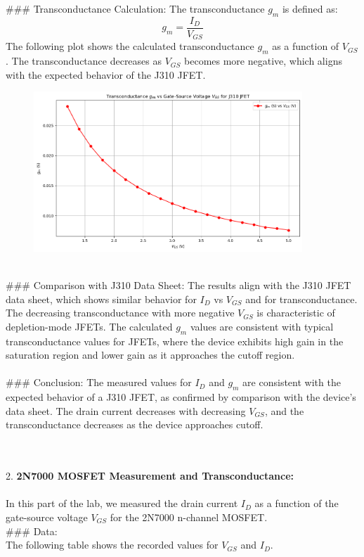 \documentclass{article}
\begin{document}
### Transconductance Calculation:
The transconductance \( g_m \) is defined as:
\[
g_m = \frac{I_D}{V_{GS}}
\]
The following plot shows the calculated transconductance \( g_m \) as a function of \( V_{GS} \). The transconductance decreases as \( V_{GS} \) becomes more negative, which aligns with the expected behavior of the J310 JFET.

\begin{figure}[H]
    \centering
    \includegraphics[width=0.9\textwidth]{./img/Lab6_1_gmVSVgs.png}
    \caption{}
    \label{fig:graph1} 
\end{figure}
\\ 
### Comparison with J310 Data Sheet:
The results align with the J310 JFET data sheet, which shows similar behavior for \( I_D \) vs \( V_{GS} \) and for transconductance. The decreasing transconductance with more negative \( V_{GS} \) is characteristic of depletion-mode JFETs. The calculated \( g_m \) values are consistent with typical transconductance values for JFETs, where the device exhibits high gain in the saturation region and lower gain as it approaches the cutoff region.
\\ \\  
### Conclusion:
The measured values for \( I_D \) and \( g_m \) are consistent with the expected behavior of a J310 JFET, as confirmed by comparison with the device's data sheet. The drain current decreases with decreasing \( V_{GS} \), and the transconductance decreases as the device approaches cutoff.

\\ \\ 
2. \textbf{2N7000 MOSFET Measurement and Transconductance:}
\\ \\ 

In this part of the lab, we measured the drain current \( I_D \) as a function of the gate-source voltage \( V_{GS} \) for the 2N7000 n-channel MOSFET.
\\ 
### Data:\\ 
The following table shows the recorded values for \( V_{GS} \) and \( I_D \). \\ 
\end{document}
